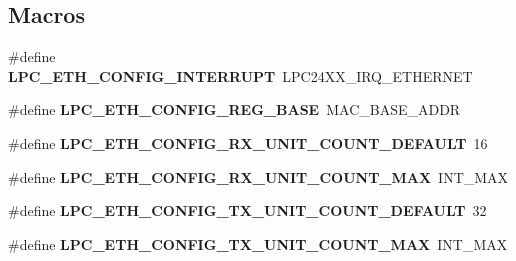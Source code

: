 \subsection*{Macros}
\begin{DoxyCompactItemize}
\item 
\mbox{\label{lpc24xx_2include_2bsp_2lpc-ethernet-config_8h_a8a164ecfd413f0040e45e089b5b6f4e3}} 
\#define {\bfseries L\+P\+C\+\_\+\+E\+T\+H\+\_\+\+C\+O\+N\+F\+I\+G\+\_\+\+I\+N\+T\+E\+R\+R\+U\+PT}~L\+P\+C24\+X\+X\+\_\+\+I\+R\+Q\+\_\+\+E\+T\+H\+E\+R\+N\+ET
\item 
\mbox{\label{lpc24xx_2include_2bsp_2lpc-ethernet-config_8h_af330255f00e038cdc0a45e39c5128667}} 
\#define {\bfseries L\+P\+C\+\_\+\+E\+T\+H\+\_\+\+C\+O\+N\+F\+I\+G\+\_\+\+R\+E\+G\+\_\+\+B\+A\+SE}~M\+A\+C\+\_\+\+B\+A\+S\+E\+\_\+\+A\+D\+DR
\item 
\mbox{\label{lpc24xx_2include_2bsp_2lpc-ethernet-config_8h_a5abced149c27528aa2c496a5357e2083}} 
\#define {\bfseries L\+P\+C\+\_\+\+E\+T\+H\+\_\+\+C\+O\+N\+F\+I\+G\+\_\+\+R\+X\+\_\+\+U\+N\+I\+T\+\_\+\+C\+O\+U\+N\+T\+\_\+\+D\+E\+F\+A\+U\+LT}~16
\item 
\mbox{\label{lpc24xx_2include_2bsp_2lpc-ethernet-config_8h_a1f76684f0688dfddd706ea14b4fd43dc}} 
\#define {\bfseries L\+P\+C\+\_\+\+E\+T\+H\+\_\+\+C\+O\+N\+F\+I\+G\+\_\+\+R\+X\+\_\+\+U\+N\+I\+T\+\_\+\+C\+O\+U\+N\+T\+\_\+\+M\+AX}~I\+N\+T\+\_\+\+M\+AX
\item 
\mbox{\label{lpc24xx_2include_2bsp_2lpc-ethernet-config_8h_ad64c8b27013b429a660a61789a166f7d}} 
\#define {\bfseries L\+P\+C\+\_\+\+E\+T\+H\+\_\+\+C\+O\+N\+F\+I\+G\+\_\+\+T\+X\+\_\+\+U\+N\+I\+T\+\_\+\+C\+O\+U\+N\+T\+\_\+\+D\+E\+F\+A\+U\+LT}~32
\item 
\mbox{\label{lpc24xx_2include_2bsp_2lpc-ethernet-config_8h_aee16a5d417297e53eff0762cea2dffbf}} 
\#define {\bfseries L\+P\+C\+\_\+\+E\+T\+H\+\_\+\+C\+O\+N\+F\+I\+G\+\_\+\+T\+X\+\_\+\+U\+N\+I\+T\+\_\+\+C\+O\+U\+N\+T\+\_\+\+M\+AX}~I\+N\+T\+\_\+\+M\+AX
\item 

\end{DoxyCompactItemize}
